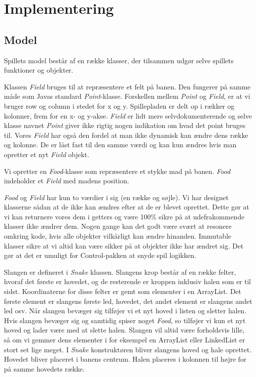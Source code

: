 \section{Implementering}

\subsection{Model}
Spillets model består af en række klasser, der tilsammen udgør selve spillets funktioner og objekter.

Klassen \textit{Field} bruges til at repræsentere et felt på banen. Den fungerer på samme måde som Javas standard \textit{Point}-klasse. Forskellen mellem \textit{Point} og \textit{Field}, er at vi bruger row og column i stedet for x og y. Spillepladen er delt op i rækker og kolonner, frem for en x- og y-akse. \textit{Field} er lidt mere selvdokumenterende og selve klasse navnet \textit{Point} giver ikke rigtig nogen indikation om hvad det point bruges til. Vores \textit{Field} har også den fordel at man ikke dynamisk kan ændre dens række og kolonne. De er låst fast til den samme værdi og kan kun ændres hvis man opretter et nyt \textit{Field} objekt.

Vi opretter en \textit{Food}-klasse som repræsentere et stykke mad på banen. \textit{Food} indeholder et \textit{Field} med madens position.

\textit{Food} og \textit{Field} har kun to værdier i sig (en række og søjle). Vi har designet klasserne sådan at de ikke kan ændres efter at de er blevet oprettet. Dette gør at vi kan returnere vores dem i getters og være 100\% sikre på at udefrakommende klasser ikke ændrer dem. Nogen gange kan det godt være svært at resonere omkring kode, hvis alle objekter vilkårligt kan ændre hinanden. Immutable klasser sikre at vi altid kan være sikker på at objekter ikke har ændret sig. Det gør at det er umuligt for Control-pakken at snyde spil logikken.

Slangen er defineret i \textit{Snake} klassen. Slangens krop består af en række felter, hvoraf det første er hovedet, og de resterende er kroppen inklusiv halen som er til sidst. Koordinaterne for disse felter er gemt som elementer i en ArrayList. Det første element er slangens første led, hovedet, det andet element er slangens andet led osv. Når slangen bevæger sig tilføjer vi et nyt hoved i listen og sletter halen. Hvis slangen bevæger sig og samtidig spiser noget \textit{Food}, so tilføjer vi kun et nyt hoved og lader være med at slette halen. Slangen vil altid være forholdsvis lille, så om vi gemmer dens elementer i for eksempel en ArrayList eller LinkedList er stort set lige meget. I \textit{Snake} konstruktøren bliver slangens hoved og hale oprettet. Hovedet bliver placeret i banens centrum. Halen placeres i kolonnen til højre for på samme hovedets række.

